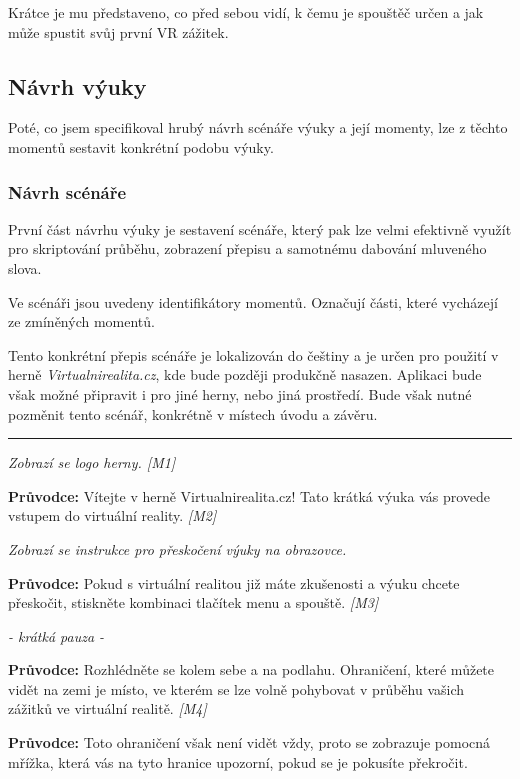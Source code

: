 Krátce je mu představeno, co před sebou vidí, k čemu je spouštěč určen a
jak může spustit svůj první VR zážitek.

\subsection{Návrh výuky}\label{nuxe1vrh-vuxfduky}

Poté, co jsem specifikoval hrubý návrh scénáře výuky a její momenty, lze
z těchto momentů sestavit konkrétní podobu výuky.

\subsubsection{Návrh scénáře}\label{nuxe1vrh-scuxe9nuxe1ux159e}

První část návrhu výuky je sestavení scénáře, který pak lze velmi
efektivně využít pro skriptování průběhu, zobrazení přepisu a samotnému
dabování mluveného slova.

Ve scénáři jsou uvedeny identifikátory momentů. Označují části, které
vycházejí ze zmíněných momentů.

Tento konkrétní přepis scénáře je lokalizován do češtiny a je určen pro
použití v herně \emph{Virtualnirealita.cz}, kde bude později produkčně
nasazen. Aplikaci bude však možné připravit i pro jiné herny, nebo jiná
prostředí. Bude však nutné pozměnit tento scénář, konkrétně v místech
úvodu a závěru.

\begin{center}\rule{0.5\linewidth}{\linethickness}\end{center}

\emph{Zobrazí se logo herny. {[}M1{]}}

\textbf{Průvodce:} Vítejte v herně Virtualnirealita.cz! Tato krátká
výuka vás provede vstupem do virtuální reality. \emph{{[}M2{]}}

\emph{Zobrazí se instrukce pro přeskočení výuky na obrazovce.}

\textbf{Průvodce:} Pokud s virtuální realitou již máte zkušenosti a
výuku chcete přeskočit, stiskněte kombinaci tlačítek menu a spouště.
\emph{{[}M3{]}}

\emph{- krátká pauza -}

\textbf{Průvodce:} Rozhlédněte se kolem sebe a na podlahu. Ohraničení,
které můžete vidět na zemi je místo, ve kterém se lze volně pohybovat v
průběhu vašich zážitků ve virtuální realitě. \emph{{[}M4{]}}

\textbf{Průvodce:} Toto ohraničení však není vidět vždy, proto se
zobrazuje pomocná mřížka, která vás na tyto hranice upozorní, pokud se
je pokusíte překročit.

